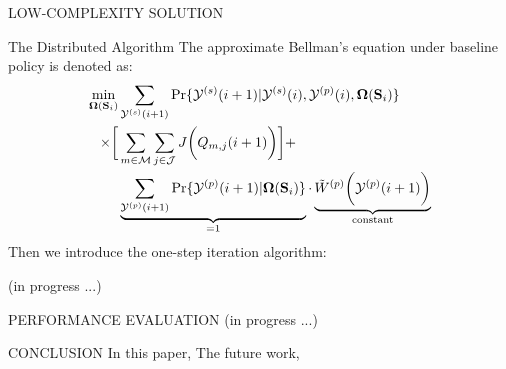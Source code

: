 \documentclass[10pt, conference, letterpaper]{IEEEtran}
\renewcommand{\vec}{\mathbf}
\DeclarePairedDelimiter{\Paren}{\bigg(}{\bigg)}
\DeclarePairedDelimiter{\Bracket}{\bigg[}{\bigg]}
\newcommand{\esSet}{\mathcal{M}}
\newcommand{\jSpace}{\mathcal{J}}
\newcommand{\Stat}{\mathbf{S}}
\newcommand{\Obsv}{\mathcal{Y}}
\newcommand{\Policy}{\mathbf{\Omega}}
\begin{document}
\begin{section}{LOW-COMPLEXITY SOLUTION}
        \begin{subsection}{The Distributed Algorithm}
            The approximate Bellman's equation under baseline policy is denoted as:
            \begin{align}
                \min_{\Policy(\Stat_i)}& \sum_{\Obsv^{(s)}(i+1)} \Pr\{\Obsv^{(s)}(i+1)|\Obsv^{(s)}(i), \Obsv^{(p)}(i), \Policy(\Stat_i)\}
                \nonumber\\
                \times \Bracket{
                    & \sum_{m\in\esSet}\sum_{j\in\jSpace} J\Paren{Q_{m,j}(i+1)}
                } +
                \nonumber\\
                & \underbrace{\sum_{\Obsv^{(p)}(i+1)} \Pr\{\Obsv^{(p)}(i+1)|\Policy(\Stat_i)\}}_{\text{=1}}
                \cdot \underbrace{\tilde{W}^{(p)} \Paren{\Obsv^{(p)}(i+1)}}_{\text{constant}}
            \end{align}
            Then we introduce the one-step iteration algorithm:
            \begin{algorithm}[H]
                \caption{Distributed Algorithm for $k$-th AP}
                \begin{algorithmic}
                    \WHILE{\TRUE}
                        \STATE (in progress ...)
                    \ENDWHILE
                \end{algorithmic}
            \end{algorithm}
        \end{subsection}
        
    \end{section}

    \begin{section}{PERFORMANCE EVALUATION}
        \label{sec:evaluation}
        (in progress ...)
    \end{section}

    \begin{section}{CONCLUSION}
        \label{sec:conclusion}
        In this paper,
        The future work,
    \end{section}
    
\end{document}
